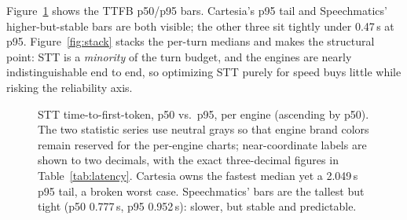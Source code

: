 \documentclass[11pt]{article}
\begin{document}
Figure~\ref{fig:ttfb} shows the TTFB p50/p95 bars. Cartesia's p95 tail and
Speechmatics' higher-but-stable bars are both visible; the other three sit
tightly under 0.47\,s at p95. Figure~\ref{fig:stack} stacks the per-turn
medians and makes the structural point: STT is a \emph{minority} of the turn
budget, and the engines are nearly indistinguishable end to end, so optimizing
STT purely for speed buys little while risking the reliability axis.

\begin{figure}[ht]
\centering
{}
\caption{STT time-to-first-token, p50 vs.\ p95, per engine (ascending by p50).
The two statistic series use neutral grays so that engine brand colors remain
reserved for the per-engine charts; near-coordinate labels are shown to two
decimals, with the exact three-decimal figures in Table~\ref{tab:latency}.
Cartesia owns the fastest median yet a 2.049\,s p95 tail, a broken worst case.
Speechmatics' bars are the tallest but tight (p50 0.777\,s, p95 0.952\,s):
slower, but stable and predictable.}
\label{fig:ttfb}
\end{figure}
\end{document}
